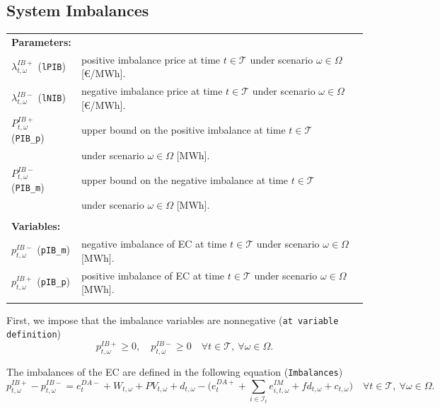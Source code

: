 \documentclass{article}
\begin{document}
\subsection{System Imbalances}



\begin{tabularx}{\textwidth}{l l}
    \textbf{Parameters:} \\
    $\lambda^{IB+}_{t, \omega}$ (\verb|lPIB|) & positive imbalance price at time $t \in \mathcal{T}$ under scenario $\omega \in \Omega$ [\euro/MWh]. \\
	$\lambda^{IB-}_{t, \omega}$ (\verb|lNIB|) & negative imbalance price at time $t \in \mathcal{T}$ under scenario $\omega \in \Omega$ [\euro/MWh]. \\
    $P^{IB+}_{t, \omega}$ (\verb|PIB_p|) & upper bound on the positive imbalance at time $t \in \mathcal{T}$ \\
    & under scenario $\omega \in \Omega$ [MWh]. \\
	$P^{IB-}_{t, \omega}$ (\verb|PIB_m|) & upper bound on the negative imbalance at time $t \in \mathcal{T}$ \\ 
	& under scenario $\omega \in \Omega$ [MWh]. \\
    \\ 
       
    \textbf{Variables:} \\
    $p_{t, \omega}^{IB-}$ (\verb|pIB_m|) & negative imbalance of EC at time $t \in \mathcal{T}$ under scenario $\omega \in \Omega$ [MWh].	\\
	$p_{t, \omega}^{IB+}$ (\verb|pIB_p|) & positive imbalance of EC at time $t \in \mathcal{T}$ under scenario $\omega \in \Omega$ [MWh].	\\ 
    \\
\end{tabularx}

First, we impose that the imbalance variables are nonnegative (\verb|at variable definition|)
\begin{equation} \label{EQ:IBVarDef}
    p_{t, \omega}^{IB+} \geq 0, \quad p_{t, \omega}^{IB-} \geq 0 \quad \forall t \in \mathcal{T}, \ \forall \omega \in \Omega.
\end{equation}

The imbalances of the EC are defined in the following equation (\verb|Imbalances|)
\begin{equation} \label{EQ:IBDef}
    p^{IB+}_{t, \omega} - p^{IB-}_{t, \omega} = e^{DA-}_{t} + W_{t, \omega} + PV_{t, \omega} + d_{t, \omega} - \Big (e^{DA+}_{t} + \sum_{i \in \mathcal{I}_t} e^{IM}_{i, t, \omega} + fd_{t, \omega} + c_{t, \omega} \Big ) \quad \forall t \in \mathcal{T}, \ \forall \omega \in \Omega.
\end{equation}
\end{document}
